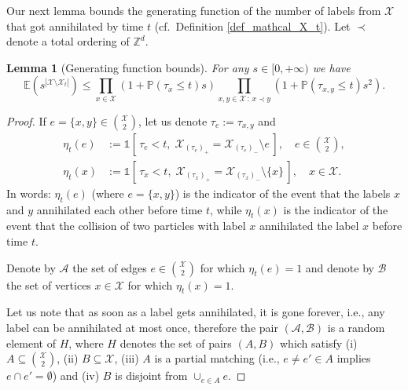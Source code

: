 \documentclass[a4paper,12pt]{article}
\newtheorem  {lemma}         [theorem]{Lemma}
\newcommand{\Z}{\mathbb{Z}}
\begin{document}
Our next lemma bounds the generating function of the number of labels from $\mathcal{X}$ that got annihilated by time $t$ (cf.\ Definition \ref{def_mathcal_X_t}).
Let $\prec$ denote a total ordering of $\Z^d$.

\begin{lemma}[Generating function bounds]
\label{lemma_annihilation}
 For any $s \in [0,+\infty )$ we have
\begin{equation}\label{annihilation_momgen_ineq}
\mathbb{E}\left( s^{|\mathcal{X} \setminus \mathcal{X}_t|} \right)  \leq   \prod_{ x \in \mathcal{X} } \left( 1+ \mathbb{P}(\tau_{x} \leq t )s \right)  \prod_{x,y \in \mathcal{X} \, : \,  x \prec y} \left( 1+ \mathbb{P}(\tau_{x,y} \leq t ) s^2 \right).
\end{equation}
\end{lemma}
\begin{proof}  If  $e=\{ x,y \} \in \binom{\mathcal{X}}{2}$, let us denote $\tau_e:=\tau_{x,y}$ and
\begin{align}
 \eta_t( e )&:=\mathds{1}\left[ \, \tau_{e} < t, \;  \mathcal{X}_{(\tau_{e})_+ }=  \mathcal{X}_{(\tau_{e})_-}\setminus e    \,  \right], \quad e \in \binom{\mathcal{X}}{2},  \\
\eta_t(x)&:=\mathds{1}\left[ \, \tau_{x} < t, \;  \mathcal{X}_{(\tau_{x})_+ }=  \mathcal{X}_{(\tau_{x})_-}\setminus \{ x \}   \,  \right], \quad x \in \mathcal{X}.
\end{align}
In words: $\eta_t(e)$ (where $e=\{x,y\}$) is the indicator of the event that the labels $x$ and $y$ annihilated each other before time $t$,
while $\eta_t(x)$  is the indicator of the event that the collision of two particles with label $x$ annihilated the label $x$ before time $t$.

 Denote by $\mathcal{A}$ the set of edges $e \in \binom{\mathcal{X}}{2}$ for which $\eta_t(e)=1$ and denote by $\mathcal{B}$ the set of vertices $x \in \mathcal{X}$ for which
$\eta_t(x)=1$.

\smallskip


 Let us note that as soon as a label gets annihilated, it is gone forever, i.e.,  any label
 can be annihilated at most once, therefore the pair $(\mathcal{A}, \mathcal{B})$ is a random element of $H$, where
 $H$ denotes the set of pairs $(A,B)$ which satisfy (i) $A \subseteq \binom{\mathcal{X}}{2}$, (ii) $B \subseteq \mathcal{X}$, (iii) $A$ is a partial matching (i.e., $e \neq e' \in A$ implies $e \cap e' = \emptyset$) and (iv) $B$ is disjoint from
$\cup_{e \in A} e$.


\end{proof}
\end{document}

